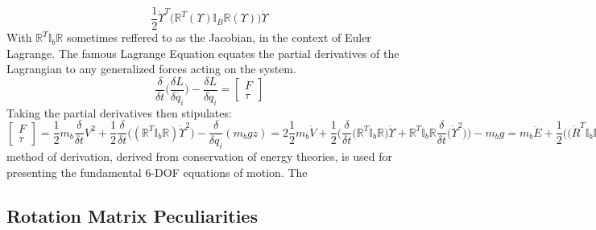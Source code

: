 \begin{equation}
\frac{1}{2}\dot{\Upsilon}^T\big(\mathbb{R}^T(\Upsilon)\mathbb{I}_B\mathbb{R}(\Upsilon)\big)\dot{\Upsilon}
\end{equation} 
With $\mathbb{R}^T\mathbb{I}_b\mathbb{R}$ sometimes reffered to as the Jacobian, in the context of Euler Lagrange. The famous Lagrange Equation equates the partial derivatives of the Lagrangian to any generalized forces acting on the system.
\begin{equation}
\frac{\delta}{\delta t}\bigg(\frac{\delta L}{\delta \dot{q_i}}\bigg)-\frac{\delta L}{\delta q_i} = \begin{bmatrix}
F\\
\tau
\end{bmatrix}
\end{equation}
Taking the partial derivatives then stipulates:
\begin{subequations}
\begin{equation}
\begin{bmatrix}
F\\
\tau
\end{bmatrix}
=
\frac{1}{2}m_b\frac{\delta}{\delta t}V^2+\frac{1}{2}\frac{\delta}{\delta t}\big((\mathbb{R}^{T}\mathbb{I}_b\mathbb{R})\dot{\Upsilon}^{2}\big)-\frac{\delta}{\delta q_i}(m_bgz)
\end{equation}
\begin{equation}
=2\frac{1}{2}m_b\dot{V}+\frac{1}{2}\bigg(\frac{\delta}{\delta t}\big(\mathbb{R}^T\mathbb{I}_b\mathbb{R}\big)\dot{\Upsilon}+\mathbb{R}^T\mathbb{I}_b\mathbb{R}\frac{\delta}{\delta t}\big(\dot{\Upsilon}^2\big)\bigg)-m_bg
\end{equation}
\begin{equation}
=m_b\ddot{E}+\frac{1}{2}\bigg(\big(\dot{R}^T\mathbb{I}_b\mathbb{R}+\mathbb{R}^T\mathbb{I}_b\dot{\mathbb{R}}\big)\dot{\Upsilon}+2\mathbb{R}^T\mathbb{I}_b\mathbb{R}\ddot{\Upsilon}\bigg)-m_bg
\end{equation}
\begin{equation}
=m_b\ddot{E}+\frac{1}{2}\bigg(\big(\mathbb{S}\mathbb{R}(\omega)
\end{equation}
\end{subequations}
 method of derivation, derived from conservation of energy theories, is used for presenting the fundamental 6-DOF equations of motion. The 

\subsection{Rotation Matrix Peculiarities}\label{subsec:dynamics.rigidbody.singularity}
